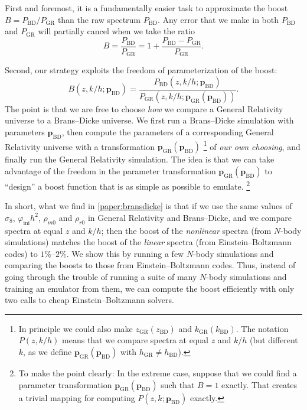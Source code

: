 \documentclass[USenglish, thumbmarks]{uiophdthesis} %
\newcommand\ini{\mathrm{ini}}
\newcommand\EB{Einstein--Boltzmann}
\newcommand\GR{General Relativity}
\newcommand\BD{Brans--Dicke}
\begin{document}
First and foremost,
it is a fundamentally easier task to approximate the boost $B = P_\mathrm{BD}/P_\mathrm{GR}$ than the raw spectrum $P_\mathrm{BD}$.
Any error that we make in both $P_\mathrm{BD}$ and $P_\mathrm{GR}$ will partially cancel when we take the ratio
\begin{equation}
B = \frac{P_\mathrm{BD}}{P_{\mathrm{GR}}} = 1 + \frac{P_\mathrm{BD}-P_\mathrm{GR}}{P_{\mathrm{GR}}} .
\label{eq:boost_error}
\end{equation}

Second, our strategy exploits the freedom of parameterization of the boost:
\begin{equation}
B(z, k/h; \mathbf{p}_\mathrm{BD}) = \frac{P_\mathrm{BD}(z, k/h; \mathbf{p}_\mathrm{BD})}{P_\mathrm{GR}(z, k/h; \mathbf{p}_\mathrm{GR}(\mathbf{p}_\mathrm{BD}))} .
\end{equation}
The point is that we are free to choose \emph{how} we compare a \GR{} universe to a \BD{} universe.
We first run a \BD{} simulation with parameters $\mathbf{p}_\mathrm{BD}$,
then compute the parameters of a corresponding \GR{} universe
with a transformation $\mathbf{p}_\mathrm{GR}(\mathbf{p}_\mathrm{BD})$%
\footnote{In principle we could also make
$z_\mathrm{GR}(z_\mathrm{BD})$ and $k_\mathrm{GR}(k_\mathrm{BD})$.
The notation $P(z, k/h)$ means that we compare spectra at equal $z$ and $k/h$
(but different $k$, as we define $\mathbf{p}_\mathrm{GR}(\mathbf{p}_\mathrm{BD})$ with $h_\mathrm{GR} \neq h_\mathrm{BD}$).}
of \emph{our own choosing},
and finally run the \GR{} simulation.
The idea is that we can take advantage of the freedom in the parameter transformation
$\mathbf{p}_\mathrm{GR}(\mathbf{p}_\mathrm{BD})$
to \enquote{design} a boost function that is as simple as possible to emulate.%
\footnote{To make the point clearly:
In the extreme case, suppose that we could find a parameter transformation
$\mathbf{p}_\mathrm{GR}(\mathbf{p}_\mathrm{BD})$ such that $B = 1$ exactly.
That creates a trivial mapping for computing $P(z, k; \mathbf{p}_\mathrm{BD})$ exactly.
}

In short, what we find in \cref{paper:bransdicke} is that
if we use the same values of $\sigma_8$, $\varphi_\ini h^2$, $\rho_{m0}$ and $\rho_{r0}$ in \GR{} and \BD{},
and we compare spectra at equal $z$ and $k/h$;
then the boost of the \emph{nonlinear} spectra (from $N$-body simulations)
matches the boost of the \emph{linear} spectra (from \EB{} codes) to $1\%$--$2\%$.
We show this by running a few $N$-body simulations and comparing the boosts to those from \EB{} codes.
Thus, instead of going through the trouble of running a suite of many $N$-body simulations
and training an emulator from them,
we can compute the boost efficiently with only two calls to cheap \EB{} solvers.
\end{document}
